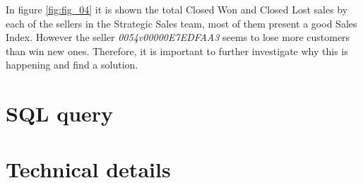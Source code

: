 \documentclass[]{report}
\begin{document}
In figure \ref{fig:fig_04} it is shown the total Closed Won and Closed Lost sales by each of the sellers in the Strategic Sales team, most of them present a good Sales Index. However the seller \textit{0054v00000E7EDFAA3} seems to lose more customers than win new ones. Therefore, it is important to further investigate why this is happening and find a solution.


\chapter{SQL query}

\chapter{Technical details}
\end{document}
